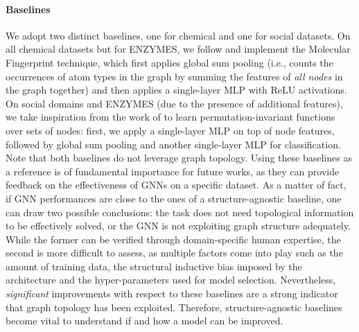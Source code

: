 \documentclass{article}
\newcommand{\ie}{i.e., }
\begin{document}
\paragraph{Baselines} We adopt two distinct baselines, one for chemical and one for social datasets. On all chemical datasets but for ENZYMES, we follow \citet{graph-kernels-baldi, lio-baseline-mlp} and implement the Molecular Fingerprint technique, which first applies global sum pooling (\ie counts the occurrences of atom types in the graph by summing the features of \textit{all nodes} in the graph together) and then applies a single-layer MLP with ReLU activations. On social domains and ENZYMES (due to the presence of additional features), we take inspiration from the work of \citet{deep-sets} to learn permutation-invariant functions over sets of nodes: first, we apply a single-layer MLP on top of node features, followed by global sum pooling and another single-layer MLP for classification. Note that both baselines do not leverage graph topology. Using these baselines as a reference is of fundamental importance for future works, as they can provide feedback on the effectiveness of GNNs on a specific dataset. As a matter of fact, if GNN performances are close to the ones of a structure-agnostic baseline, one can draw two possible conclusions: the task does not need topological information to be effectively solved, or the GNN is not exploiting graph structure adequately. While the former can be verified through domain-specific human expertise, the second is more difficult to assess, as multiple factors come into play such as the amount of training data, the structural inductive bias imposed by the architecture and the hyper-parameters used for model selection. Nevertheless, \textit{significant} improvements with respect to these baselines are a strong indicator that graph topology has been exploited. Therefore, structure-agnostic baselines become vital to understand if and how a model can be improved.
\end{document}
